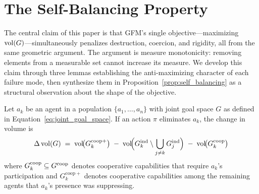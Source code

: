 %
%
%

\section{The Self-Balancing Property}
\label{sec:self_balancing}

The central claim of this paper is that GFM's single objective---maximizing
$\operatorname{vol}(G)$---simultaneously penalizes destruction, coercion, and rigidity, all
from the same geometric argument. The argument is measure monotonicity:
removing elements from a measurable set cannot increase its measure. We develop
this claim through three lemmas establishing the anti-maximizing character of
each failure mode, then synthesize them in
Proposition~\ref{prop:self_balancing} as a structural observation about the
shape of the objective.


\begin{lemma}
\label{lem:destruction}
Let $a_k$ be an agent in a population $\{a_1, \ldots, a_n\}$ with joint goal
    space $G$ as defined in Equation~\eqref{eq:joint_goal_space}. If an action
    $\pi$ eliminates $a_k$, the change in volume is
\begin{equation}
\label{eq:destruction_bound}
\Delta \operatorname{vol}(G) \;=\; \operatorname{vol}\!\bigl(G^{\mathrm{coop}+}_{k}\bigr) \;-\; \operatorname{vol}\!\Bigl(G_{k}^{\mathrm{ind}} \setminus \bigcup_{j \neq k} G_{j}^{\mathrm{ind}}\Bigr) \;-\; \operatorname{vol}\!\bigl(G^{\mathrm{coop}}_{k}\bigr)
\end{equation}
where $G^{\mathrm{coop}}_{k} \subseteq G^{\mathrm{coop}}$ denotes cooperative capabilities that require $a_k$'s participation and $G^{\mathrm{coop}+}_{k}$ denotes cooperative capabilities among the remaining agents that $a_k$'s presence was suppressing.
\end{lemma}

